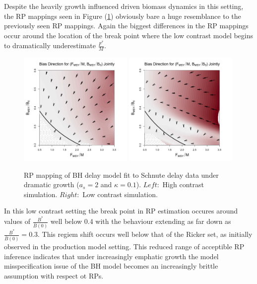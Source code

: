 %
Despite the heavily growth influenced driven biomass dynamics in this setting, 
the RP mappings seen in Figure (\ref{dramaticGrowth}) obviously bare a huge 
resemblance to the previously seen RP mappings. Again the biggest differences 
in the RP mappings occur around the location of the break point where the low 
contrast model begins to dramatically underestimate $\frac{F^*}{M}$.
\begin{figure}[h!]
\includegraphics[width=0.49\textwidth]{../ddBias/directionalBiasDDSubExpT45N150A0-1AS2K0.1.png}
\includegraphics[width=0.49\textwidth]{../ddBias/directionalBiasDDSubFlatT45N150A0-1AS2K0.1N84Edge.png}
\caption{
RP mapping of BH delay model fit to Schnute delay data under dramatic growth ($a_s=2$ and $\kappa=0.1$).
$Left:$ High contrast simulation.
$Right:$ Low contrast simulation.
}\label{dramaticGrowth}
\end{figure}
%
In this low contrast setting the break point in RP estimation occures around values of
$\frac{B^*}{\bar B(0)}$ well below 0.4 with the behaviour extending as far down as 
$\frac{B^*}{\bar B(0)}=0.3$. This regiem shift occurs well below that of the Ricker
set, as initially observed in the production model setting.
This reduced range of acceptible RP inference indicates that under increasingly
emphatic growth
the model misspecification issue of the BH model becomes an
increasingly brittle assumption with respect ot RPs.

